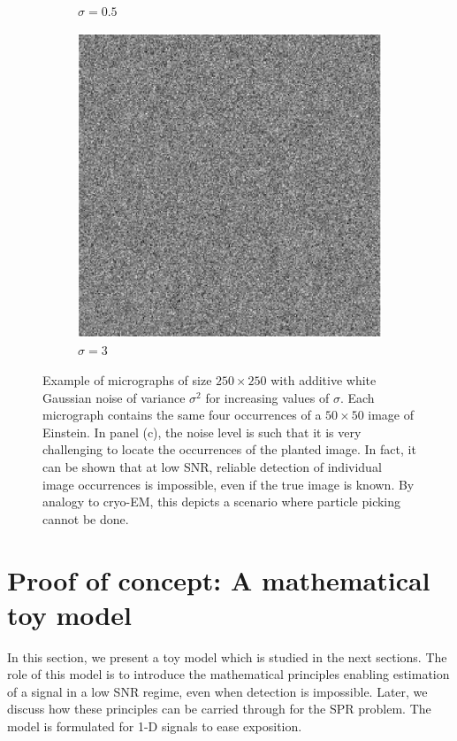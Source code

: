 \documentclass[9pt,twocolumn,twoside,lineno]{pnas-new}
\begin{document}
\begin{figure}[h]
\begin{subfigure}[h]{0.33\textwidth}
		\caption{$\sigma = 0.5$}
	\end{subfigure}
	\begin{subfigure}[h]{0.33\textwidth}
		\centering
		\includegraphics[scale=0.5]{micrograph_Einstein_example_s3}
		\caption{$\sigma = 3$}
	\end{subfigure}
	\caption{\label{fig:micro_example} Example of micrographs of size $250\times 250$ with additive white Gaussian noise of variance $\sigma^2$ for increasing values of $\sigma$. Each micrograph contains the same four occurrences of a $50 \times 50$ image of Einstein. In panel (c), the noise level is such that it is very challenging to locate the occurrences of the planted image. In fact, it can be shown that at low SNR, reliable detection of individual image occurrences is impossible, even if the true image is known. By analogy to cryo-EM, this depicts a scenario where particle picking cannot be done.}	
\end{figure}


\section{Proof of concept: A mathematical toy model}

In this section, we present a toy model which is studied in the next sections. 
The role of this model is to introduce the mathematical principles enabling estimation of a signal in a low SNR regime, even when detection is impossible. Later, we discuss how these principles can be carried through for the SPR problem. The model is formulated for 1-D signals to ease exposition.   
\end{document}
